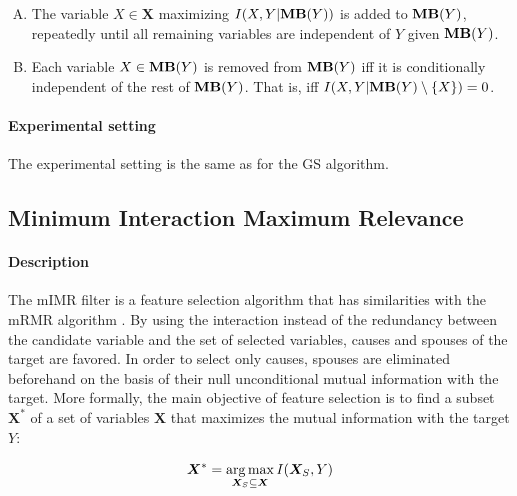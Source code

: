 \begin{enumerate}[A)]
    \item The variable $X\in\bm X$ maximizing $I(X, Y|\textbf{MB}(Y))$ is added
    to $\textbf{MB}(Y)$, repeatedly until all remaining variables are
    independent of $Y$ given $\textbf{MB}(Y)$.
    \item Each variable $X\in\textbf{MB}(Y)$ is removed from $\textbf{MB}(Y)$
    iff it is conditionally independent of the rest of $\textbf{MB}(Y)$. That
    is, iff $I(X, Y|\textbf{MB}(Y)\setminus\{X\}) = 0$.
\end{enumerate}

\paragraph{Experimental setting} The experimental setting is the same as for
the GS algorithm.

\subsection{Minimum Interaction Maximum Relevance}

\paragraph{Description} The mIMR filter \parencite{bontempi2010causal} is a
feature selection algorithm that has similarities with the mRMR algorithm
\parencite{peng2005feature}. By using the interaction instead of the redundancy
between the candidate variable and the set of selected variables, causes and
spouses of the target are favored. In order to select only causes, spouses are
eliminated beforehand on the basis of their null unconditional mutual
information with the target. More formally, the main objective of feature
selection is to find a subset $\bm X^*$ of a set of variables $\bm X$ that
maximizes the mutual information with the target $Y$:

\begin{equation}
\bm X^*=\operatorname*{arg\,max}_{\bm X_S\subseteq \bm X} I(\bm X_S,Y)
\end{equation}

